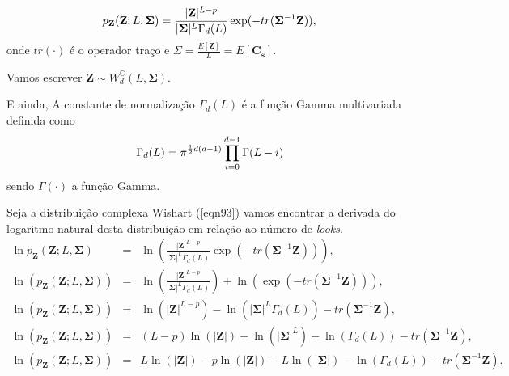 \begin{equation}\label{eqn93}
	p_{\mathbf{Z}}(\mathbf{Z};L,\mathbf{\Sigma})=\frac{|\mathbf{Z}|^{L-p}}{|\mathbf{\Sigma}|^{L}\Gamma_d(L)} \exp(-tr(\mathbf{\Sigma}^{-1}\mathbf{Z})), \\
\end{equation}
onde $tr(\cdot)$ é o operador traço e ${\Sigma}=\frac{E[\mathbf{Z}]}{L}=E[\mathbf{C_{s}}]$. 

Vamos escrever $\mathbf{Z}\sim W_d^{\mathbb C}(L, \mathbf{\Sigma})$.

E ainda, A constante de normalização $\Gamma_d(L)$ é a função Gamma multivariada definida como 
\begin{equation}\label{eqn94}
	\Gamma_d(L)=\pi^{\frac{1}{2}d(d-1)} \prod_{i=0}^{d-1}\Gamma(L-i) \\
\end{equation}
sendo $\Gamma(\cdot)$ a função Gamma.

Seja a distribuição complexa Wishart (\ref{eqn93}) vamos encontrar a derivada do logaritmo natural desta distribuição em relação ao número de {\it looks}.
\begin{equation}\label{eqn95}
\begin{array}{ccc}
	\ln{p_{\mathbf{Z}}(\mathbf{Z};L,\mathbf{\Sigma})}&=&\ln{\left(\frac{|\mathbf{Z}|^{L-p}}{|\mathbf{\Sigma}|^{L}\Gamma_d(L)} \exp(-tr(\mathbf{\Sigma}^{-1}\mathbf{Z}))\right)}, \\
	\ln{\left(p_{\mathbf{Z}}(\mathbf{Z};L,\mathbf{\Sigma})\right)}&=&\ln{\left(\frac{|\mathbf{Z}|^{L-p}}{|\mathbf{\Sigma}|^{L}\Gamma_d(L)}\right)}+\ln{\left( \exp(-tr(\mathbf{\Sigma}^{-1}\mathbf{Z}))\right)}, \\
	\ln{\left(p_{\mathbf{Z}}(\mathbf{Z};L,\mathbf{\Sigma})\right)}&=&\ln{\left(|\mathbf{Z}|^{L-p}\right)} - \ln{\left(|\mathbf{\Sigma}|^{L}\Gamma_d(L)\right)}-tr(\mathbf{\Sigma}^{-1}\mathbf{Z}), \\
	\ln{\left(p_{\mathbf{Z}}(\mathbf{Z};L,\mathbf{\Sigma})\right)}&=&(L-p)\ln{\left(|\mathbf{Z}|\right)} - \ln{\left(|\mathbf{\Sigma}|^{L}\right)}-\ln{\left(\Gamma_d(L)\right)}-tr(\mathbf{\Sigma}^{-1}\mathbf {Z}), \\
	\ln{\left(p_{\mathbf{Z}}(\mathbf{Z};L,\mathbf{\Sigma})\right)}&=&L\ln{\left(|\mathbf{Z}|\right)}-p\ln{\left(|\mathbf{Z}|\right)} - L\ln{\left(|\mathbf{\Sigma}|\right)}-\ln{\left(\Gamma_d(L)\right)}-tr(\mathbf{\Sigma}^{-1}\mathbf{Z}). \\
\end{array}
\end{equation}

